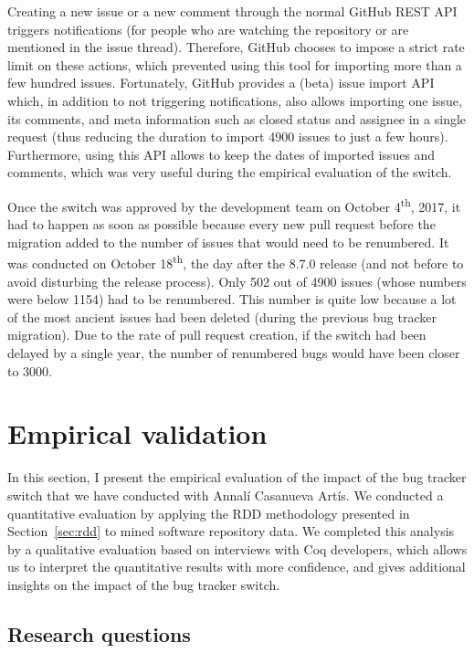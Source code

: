 Creating a new issue or a new comment through the normal GitHub REST API triggers notifications (for people who are watching the repository or are mentioned in the issue thread).
Therefore, GitHub chooses to impose a strict rate limit on these actions, which prevented using this tool for importing more than a few hundred issues.
Fortunately, GitHub provides a (beta) issue import API~\cite{github_issue_import_API} which, in addition to not triggering notifications, also allows importing one issue, its comments, and meta information such as closed status and assignee in a single request (thus reducing the duration to import 4900 issues to just a few hours).
Furthermore, using this API allows to keep the dates of imported issues and comments, which was very useful during the empirical evaluation of the switch.

Once the switch was approved by the development team on October 4\textsuperscript{th}, 2017, it had to happen as soon as possible because every new pull request before the migration added to the number of issues that would need to be renumbered.
It was conducted on October 18\textsuperscript{th}, the day after the 8.7.0 release (and not before to avoid disturbing the release process).
Only 502 out of 4900 issues (whose numbers were below 1154) had to be renumbered.
This number is quite low because a lot of the most ancient issues had been deleted (during the previous bug tracker migration).
Due to the rate of pull request creation, if the switch had been delayed by a single year, the number of renumbered bugs would have been closer to 3000.

\section{Empirical validation}

In this section, I present the empirical evaluation of the impact of the bug tracker switch that we have conducted with Annal\'i Casanueva Art\'is.
We conducted a quantitative evaluation by applying the RDD methodology presented in Section~\ref{sec:rdd} to mined software repository data.
We completed this analysis by a qualitative evaluation based on interviews with Coq developers, which allows us to interpret the quantitative results with more confidence, and gives additional insights on the impact of the bug tracker switch.

\subsection{Research questions}

